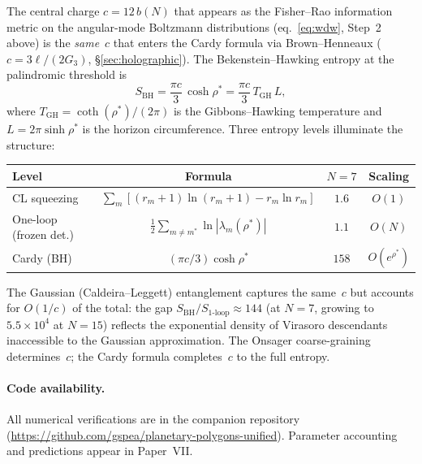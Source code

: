 \begin{remark}
\label{rmk:entropy-bridge}
The central charge $c = 12\,b(N)$ that appears as the Fisher--Rao
information metric on the angular-mode Boltzmann distributions
(eq.~\eqref{eq:wdw}, Step~2 above) is the \emph{same}~$c$ that
enters the Cardy formula via Brown--Henneaux
($c = 3\ell/(2G_3)$, \S\ref{sec:holographic}).
The Bekenstein--Hawking entropy at the palindromic threshold is
\begin{equation}\label{eq:entropy-bridge}
  S_{\mathrm{BH}} = \frac{\pi c}{3}\,\cosh\rho^*
  = \frac{\pi c}{3}\,T_{\mathrm{GH}}\,L,
\end{equation}
where $T_{\mathrm{GH}} = \coth(\rho^*)/(2\pi)$ is the
Gibbons--Hawking temperature and $L = 2\pi\sinh\rho^*$ is the
horizon circumference.
Three entropy levels illuminate the structure:
\begin{center}\small
\begin{tabular}{lccc}
\toprule
Level & Formula & $N\!=\!7$ & Scaling \\
\midrule
CL squeezing
  & $\sum_m[(r_m{+}1)\ln(r_m{+}1) - r_m\ln r_m]$
  & $1.6$ & $O(1)$ \\
One-loop (frozen det.)
  & $\tfrac{1}{2}\sum_{m \ne m^*}\ln|\lambda_m(\rho^*)|$
  & $1.1$ & $O(N)$ \\
Cardy (BH)
  & $(\pi c/3)\cosh\rho^*$
  & $158$ & $O(e^{\rho^*})$ \\
\bottomrule
\end{tabular}
\end{center}
The Gaussian (Caldeira--Leggett) entanglement captures the same~$c$
but accounts for $O(1/c)$ of the total: the gap
$S_{\mathrm{BH}}/S_{\mathrm{1\text{-}loop}} \approx 144$
(at $N = 7$, growing to $5.5 \times 10^4$ at $N = 15$)
reflects the exponential density of Virasoro descendants
inaccessible to the Gaussian approximation.
The Onsager coarse-graining determines~$c$;
the Cardy formula completes~$c$ to the full entropy.
\end{remark}

\paragraph{Code availability.}
All numerical verifications are in the companion repository
(\url{https://github.com/gspea/planetary-polygons-unified}).
Parameter accounting and predictions appear in Paper~VII.




